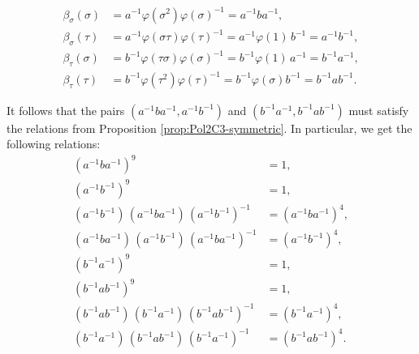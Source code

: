 \documentclass[11pt, a4paper]{amsproc}
\theoremstyle{remark}
\theoremstyle{plain}
\begin{document}
\begin{align*}
\beta_{\sigma}(\sigma)
&= a^{-1}\varphi(\sigma^2)\varphi(\sigma)^{-1}=a^{-1}ba^{-1},\\
\beta_{\sigma}(\tau)
&= a^{-1}\varphi(\sigma\tau)\varphi(\tau)^{-1}=a^{-1}\varphi(1)\,b^{-1}=a^{-1}b^{-1},\\
\beta_{\tau}(\sigma)
&= b^{-1}\varphi(\tau\sigma)\varphi(\sigma)^{-1}=b^{-1}\varphi(1)\,a^{-1}=b^{-1}a^{-1},\\
\beta_{\tau}(\tau)
&= b^{-1}\varphi(\tau^2)\varphi(\tau)^{-1}=b^{-1}\varphi(\sigma)b^{-1}=b^{-1}ab^{-1}.
\end{align*}

It follows that the pairs $(a^{-1}ba^{-1},a^{-1}b^{-1})$ and $(b^{-1}a^{-1},b^{-1}ab^{-1})$ must satisfy the relations from Proposition \ref{prop:Pol2C3-symmetric}. In particular, we get the following relations:
\begin{subequations}\label{eq:quadratic-relations}
\begin{align}
(a^{-1}ba^{-1})^9 &= 1, \label{eq:quadratic-relations-1}\\
(a^{-1}b^{-1})^9 &= 1, \label{eq:quadratic-relations-2}\\
(a^{-1}b^{-1})\,(a^{-1}ba^{-1})\,(a^{-1}b^{-1})^{-1} &= (a^{-1}ba^{-1})^4, \label{eq:quadratic-relations-3}\\
(a^{-1}ba^{-1})\,(a^{-1}b^{-1})\,(a^{-1}ba^{-1})^{-1} &= (a^{-1}b^{-1})^4, \label{eq:quadratic-relations-4}\\
(b^{-1}a^{-1})^9 &= 1, \label{eq:quadratic-relations-5}\\
(b^{-1}ab^{-1})^9 &= 1, \label{eq:quadratic-relations-6}\\
(b^{-1}ab^{-1})\,(b^{-1}a^{-1})\,(b^{-1}ab^{-1})^{-1} &= (b^{-1}a^{-1})^4, \label{eq:quadratic-relations-7}\\
(b^{-1}a^{-1})\,(b^{-1}ab^{-1})\,(b^{-1}a^{-1})^{-1} &= (b^{-1}ab^{-1})^4. \label{eq:quadratic-relations-8}
\end{align}
\end{subequations}
\end{document}
